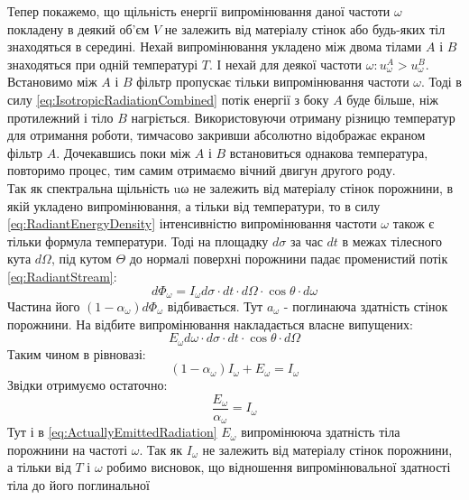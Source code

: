\documentclass{article}
\begin{document}
\Task{}Тепер покажемо, що щільність енергії випромінювання даної частоти $\omega$ покладену в деякий об’єм $V$ не залежить від матеріалу стінок або 
будь-яких тіл знаходяться в середині. Нехай випромінювання укладено між двома тілами $A$ і $B$ знаходяться при одній температурі $T$. І нехай для 
деякої частоти $\omega : u_{\omega}^{A} > u_{\omega}^{B}$. Встановимо між $A$ і $B$ фільтр пропускає тільки випромінювання частоти $\omega$. Тоді 
в силу \eqref{eq:IsotropicRadiationCombined} потік енергії з боку $A$ буде більше, ніж протилежний і тіло $B$ нагріється. Використовуючи 
отриману різницю температур для отримання роботи, тимчасово закривши абсолютно відображає екраном фільтр $A$. Дочекавшись поки між $A$ і $B$ 
встановиться однакова температура, повторимо процес, тим самим отримаємо вічний двигун другого роду. \\
Так як спектральна щільність uω не залежить від матеріалу стінок порожнини, в якій укладено випромінювання, а тільки від температури, то в 
силу \eqref{eq:RadiantEnergyDensity} інтенсивністю випромінювання частоти $\omega$ також є тільки формула температури. Тоді на площадку 
$d\sigma$ за час $dt$ в межах тілесного кута $d\Omega$, під кутом $\Theta$ до нормалі поверхні порожнини падає променистий потік \eqref{eq:RadiantStream}: 
\begin{equation}
    \label{eq:RadiantFlowToTheSquare_dsigma}
    d\Phi_{\omega} = I_{\omega} d\sigma \cdot dt \cdot d\Omega \cdot \cos{\theta} \cdot d\omega
\end{equation}
Частина його $(1 - \alpha_{\omega}) d\Phi_{\omega}$ відбивається. Тут $a_{\omega}$ - поглинаюча здатність стінок порожнини. На відбите 
випромінювання накладається власне випущених:
\begin{equation}
    \label{eq:ActuallyEmittedRadiation}
    E_{\omega} d\omega \cdot d\sigma \cdot dt \cdot \cos{\theta} \cdot d\Omega
\end{equation}
Таким чином в рівновазі: 
\begin{equation}
    \label{eq:BalanceEquation}
    (1 - \alpha_{\omega}) I_{\omega} + E_{\omega} = I_{\omega}
\end{equation}
Звідки отримуємо остаточно: 
\begin{equation}
    \label{eq:FinalCorrelation}
    \frac{E_{\omega}}{\alpha_{\omega}} = I_{\omega}
\end{equation}
Тут і в \eqref{eq:ActuallyEmittedRadiation} $E_{\omega}$ випромінююча здатність тіла порожнини на частоті $\omega$. Так як $I_{\omega}$ не залежить 
від матеріалу стінок порожнини, а тільки від $T$ і $\omega$ робимо висновок, що відношення випромінювальної здатності тіла до його поглинальної 
\end{document}
